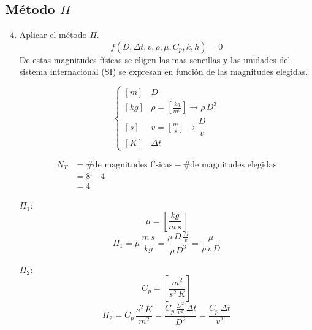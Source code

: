 \subsection{Método $\Pi$}
\begin{enumerate}
    \setcounter{enumi}{3}
    \item Aplicar el método $\Pi$.
        \begin{equation}
            f(D,\Delta{t},v,\rho,\mu,C_p,k,h) = 0
            \label{pi}
        \end{equation}
        De estas magnitudes físicas se eligen las mas sencillas y las unidades
        del sistema internacional (SI) se expresan en función de las magnitudes
        elegidas.

        \begin{equation*}
            \begin{cases}
                [m] & D \\
                [kg] & \rho = \left[\frac{kg}{m^3}\right]
                    \rightarrow \rho\,D^3 \\
                [s] & v = \left[\frac{m}{s}\right] \rightarrow \dfrac{D}{v} \\
                [K] & \Delta{t}
            \end{cases}
        \end{equation*}

        \begin{equation*}
            \begin{split}
                N_T 
                    &= \text{\# de magnitudes físicas}
                     - \text{\# de magnitudes elegidas} \\
                    &= 8 - 4 \\
                    &= 4
            \end{split}
        \end{equation*}

        \underline{$\Pi_1$}:\\
        \begin{equation*}
            \mu = \left[\frac{kg}{m\,s}\right]
        \end{equation*}
        \begin{equation*}
            \Pi_1 = \mu\,\frac{m\,s}{kg}
                = \frac{\mu\,D\,\frac{D}{v}}{\rho\,D^3}
                = \frac{\mu}{\rho\,v\,D}
        \end{equation*}

        \underline{$\Pi_2$}:\\
        \begin{equation*}
            C_p = \left[\frac{m^2}{s^2\,K}\right]
        \end{equation*}
        \begin{equation*}
            \Pi_2 = C_p\,\frac{s^2\,K}{m^2}
                = \frac{C_p\,\frac{D^2}{v^2}\,\Delta{t}}{D^2}
                = \frac{C_p\,\Delta{t}}{v^2}
        \end{equation*}


\end{enumerate}
